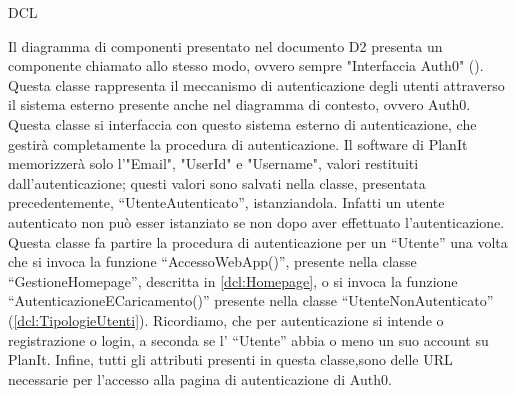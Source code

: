 \begin{listaPersonale}{DCL}
    \begin{center}
        
    \end{center}
    \newpage


    Il diagramma di componenti presentato nel documento D2 presenta un componente chiamato allo stesso modo, ovvero sempre "Interfaccia Auth0" (). Questa classe rappresenta il meccanismo di autenticazione degli utenti attraverso il sistema esterno presente anche nel diagramma di contesto, ovvero Auth0. Questa classe si interfaccia con questo sistema esterno di autenticazione, che gestirà completamente la procedura di autenticazione. Il software di PlanIt memorizzerà solo l'"Email", "UserId" e "Username", valori restituiti dall'autenticazione; questi valori sono salvati nella classe, presentata precedentemente, “UtenteAutenticato”, istanziandola. Infatti un utente autenticato non può esser istanziato se non dopo aver effettuato l'autenticazione. \\
    Questa classe fa partire la procedura di autenticazione per un “Utente” una volta che si invoca la funzione “AccessoWebApp()”, presente nella classe “GestioneHomepage”, descritta in \ref{dcl:Homepage}, o si invoca la funzione “AutenticazioneECaricamento()” presente nella classe “UtenteNonAutenticato” (\ref{dcl:TipologieUtenti}). Ricordiamo, che per autenticazione si intende o registrazione o login, a seconda se l' “Utente” abbia o meno un suo account su PlanIt. Infine, tutti gli attributi presenti in questa classe,sono delle URL necessarie per l'accesso alla pagina di autenticazione di Auth0.


    \begin{center}
        
    \end{center}
    \newpage




\end{listaPersonale}
